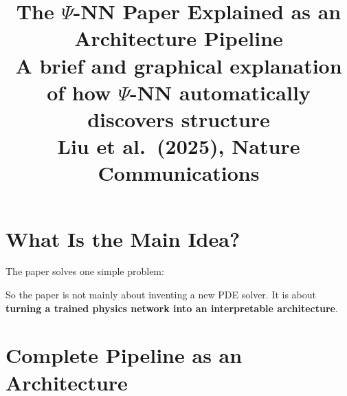 \documentclass[11pt,a4paper]{article}
\title{\textbf{The $\Psi$-NN Paper Explained as an Architecture Pipeline}\\[0.2cm]
\large A brief and graphical explanation of how $\Psi$-NN automatically discovers structure\\[0.1cm]
\normalsize Liu et al.\ (2025), Nature Communications}
\author{}
\date{}
\begin{document}
\maketitle

\section{What Is the Main Idea?}

The paper solves one simple problem:

\begin{center}
\end{center}

So the paper is not mainly about inventing a new PDE solver. It is about \textbf{turning a trained physics network into an interpretable architecture}.

\section{Complete Pipeline as an Architecture}
\end{document}
